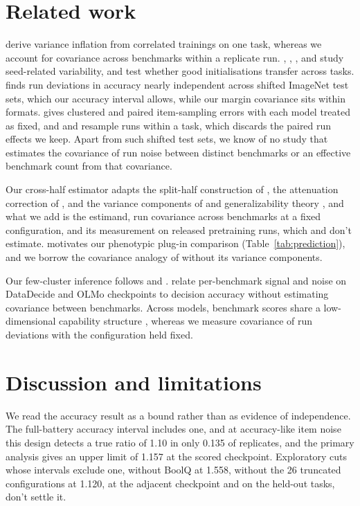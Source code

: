 \section{Related work}
\citet{bouthillier2021} derive variance inflation from correlated trainings on one task, whereas we account for covariance across benchmarks within a replicate run. \citet{reimers2017}, \citet{zhou2020}, \citet{madaan2024}, and \citet{fehlauer2025} study seed-related variability, and \citet{dodge2020} test whether good initialisations transfer across tasks. \citet{jordan2024} finds run deviations in accuracy nearly independent across shifted ImageNet test sets, which our accuracy interval allows, while our margin covariance sits within formats. \citet{miller2024} gives clustered and paired item-sampling errors with each model treated as fixed, and \citet{henderson2018} and \citet{agarwal2021} resample runs within a task, which discards the paired run effects we keep. Apart from such shifted test sets, we know of no study that estimates the covariance of run noise between distinct benchmarks or an effective benchmark count from that covariance.

Our cross-half estimator adapts the split-half construction of \citet{spearman1910,brown1910}, the attenuation correction of \citet{spearman1904}, and the variance components of \citet{searle1992} and generalizability theory \citep{brennan2001}, and what we add is the estimand, run covariance across benchmarks at a fixed configuration, and its measurement on released pretraining runs, which \citet{miller2024} and \citet{heineman2025} don't estimate. \citet{cheverud1988} motivates our phenotypic plug-in comparison (Table~\ref{tab:prediction}), and we borrow the covariance analogy of \citet{martin1977} without its variance components.

Our few-cluster inference follows \citet{cameron2008} and \citet{mackinnon2017}. \citet{heineman2025} relate per-benchmark signal and noise on DataDecide and OLMo checkpoints to decision accuracy without estimating covariance between benchmarks. Across models, benchmark scores share a low-dimensional capability structure \citep{ruan2024,burnell2023revealing}, whereas we measure covariance of run deviations with the configuration held fixed.

\section{Discussion and limitations}
We read the accuracy result as a bound rather than as evidence of independence. The full-battery accuracy interval includes one, and at accuracy-like item noise this design detects a true ratio of 1.10 in only 0.135 of replicates, and the primary analysis gives an upper limit of 1.157 at the scored checkpoint. Exploratory cuts whose intervals exclude one, without BoolQ at 1.558, without the 26 truncated configurations at 1.120, at the adjacent checkpoint and on the held-out tasks, don't settle it.


